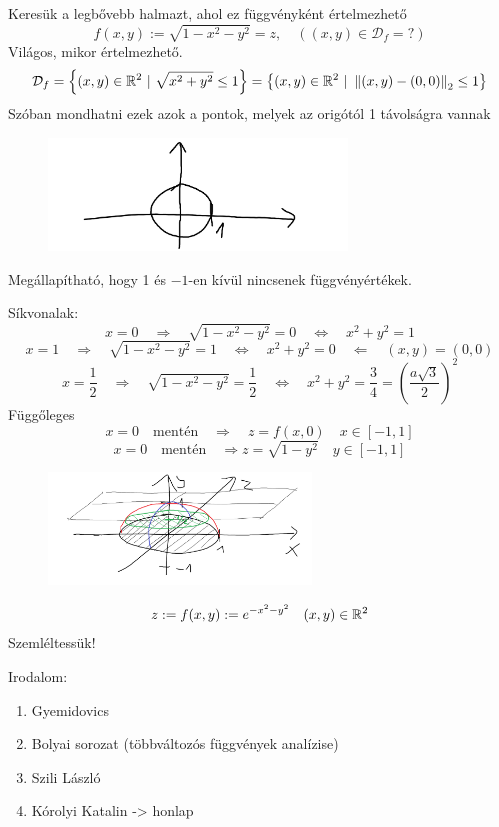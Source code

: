 \documentclass[a4paper,11.5pt]{article}
\newcommand{\norm}[1]{\left\lVert#1\right\rVert}
\begin{document}
	\begin{task}Keresük a legbővebb halmazt, ahol ez függvényként értelmezhető
		\[ f(x,y):=\sqrt{1-x^2-y^2}=z,\quad ((x,y)\in\mathcal{D}_f=?) \]
		Világos, mikor értelmezhető.
		\[ \mathcal{D}_f=\left\{(x,y)\in\R^2~|~\sqrt{x^2+y^2}\leq 1 \right\}=\left\{ (x,y)\in\R^2~|~\norm{(x,y)-(0,0)}_2\leq 1 \right\} \]
		Szóban mondhatni ezek azok a pontok, melyek az origótól 1 távolságra vannak
		\begin{figure}[H]
			\centering
			\includegraphics[height=3cm]{kepek/05.png}
			\caption{}
		\end{figure}
		Megállapítható, hogy 1 és $-1$-en kívül nincsenek függvényértékek.
		\smallskip
		
		Síkvonalak:
		\[ x=0\quad \Rightarrow\quad \sqrt{1-x^2-y^2}=0\quad \Leftrightarrow\quad x^2+y^2=1 \]
		\[ x=1\quad \Rightarrow\quad \sqrt{1-x^2-y^2}=1\quad \Leftrightarrow\quad x^2+y^2=0\quad \Leftarrow\quad (x,y)=(0,0) \]
		\[ x=\frac{1}{2}\quad \Rightarrow\quad \sqrt{1-x^2-y^2}=\frac{1}{2}\quad \Leftrightarrow\quad x^2+y^2=\frac{3}{4}=\left(\frac{a\sqrt{3}}{2}\right)^2\]
		Függőleges
		\[ x=0\quad \text{mentén}\quad \Rightarrow\quad z=f(x,0)\quad x\in[-1,1] \]
		\[ x=0\quad \text{mentén}\quad \Rightarrow z=\sqrt{1-y^2}\quad y\in[-1,1] \]
		\begin{figure}[H]
			\centering
			\includegraphics[height=3cm]{kepek/06.png}
			\caption{}
		\end{figure}
	\end{task}
	\begin{exercise}
		\[ z:=f(x,y):=e^{-x^2-y^2}\quad (x,y)\in\mathbb{R}^2 \]
		Szemléltessük!
	\end{exercise}
	\begin{note}
		Irodalom:
		\begin{enumerate}
			\item Gyemidovics
			\item Bolyai sorozat (többváltozós függvények analízise)
			\item Szili László
			\item Kórolyi Katalin -> honlap
		\end{enumerate}
	\end{note}
\end{document}
